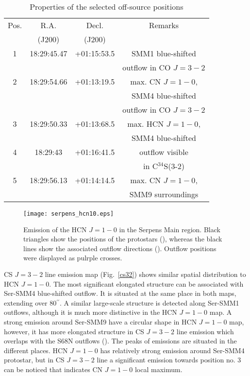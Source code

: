 \documentclass{aa}
\begin{document}
\begin{table}
\caption{Properties of the selected off-source positions}             %
\label{table:3}      %
\centering                          %
\begin{tabular}{c c c c} 
\hline\hline 
Pos. & R.A. & Decl. & Remarks\\
 & (J200) & (J200) & \\
\hline
1 & 18:29:45.47 & +01:15:53.5 & SMM1 blue-shifted \\
 & & & outflow in CO $J=3-2$\\
\hline
2 & 18:29:54.66 & +01:13:19.5 & max. CN $J=1-0$, \\
 & & & SMM4 blue-shifted \\
 & & & outflow in CO $J=3-2$\\
\hline
3 & 18:29:50.33 & +01:13:68.5 & max. HCN $J=1-0$, \\
 & & & SMM4 blue-shifted \\
\hline
4 & 18:29:43 & +01:16:41.5 & outflow visible \\
 & & &  in C$^{34}$S(3-2)\\
\hline
5 & 18:29:56.13 & +01:14:14.5 & max. CN $J=1-0$, \\
 & & & SMM9 surroundings\\
\hline
\end{tabular}
\end{table}



\begin{figure}
   \centering
   \texttt{[image: serpens\_hcn10.eps]}
      \caption{Emission of the HCN $J=1-0$ in the Serpens Main region. Black triangles show the positions of the protostars (\cite{Sur16}), whereas the black lines show the associated outflow directions (\cite{Yil15}). Outflow positions were displayed as pulrple crosses.}
         \label{hcn10}
   \end{figure}

CS $J=3-2$ line emission map (Fig.~\ref{cs32}) shows similar spatial distribution to HCN $J=1-0$. The most significant elongated structure can be associated with Ser-SMM4 blue-shifted outflow. It is situated at the same place in both maps, extending over 80$^{\prime\prime}$. A similar large-scale structure is detected along Ser-SMM1 outflows, although it is much more distinctive in the HCN $J=1-0$ map. A strong emission around Ser-SMM9 have a circular shape in HCN $J=1-0$ map, however, it has more elongated structure in CS $J=3-2$ line emission which overlaps with the S68N outflows (\cite{Kri10}). The peaks of emissions are situated in the different places. HCN $J=1-0$ has relatively strong emission around Ser-SMM4 protostar, but in CS $J=3-2$ line a significant emission towards position no. 3 can be noticed that indicates CN $J=1-0$ local maximum. 
\end{document}
